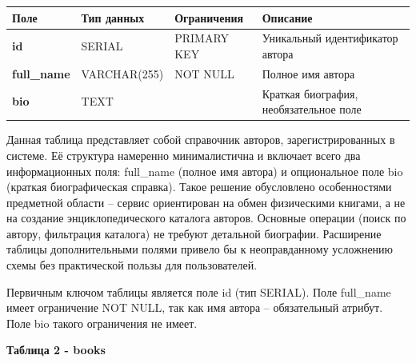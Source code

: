 \documentclass[14pt,a4paper]{extarticle}
\begin{document}
\begin{longtable}[]{@{}
  >{\centering\arraybackslash}p{}
  >{\centering\arraybackslash}p{}
  >{\centering\arraybackslash}p{}
  >{\centering\arraybackslash}p{}@{}}
\toprule\noalign{}
\begin{minipage}[b]{\linewidth}\centering
\textbf{Поле}
\end{minipage} & \begin{minipage}[b]{\linewidth}\centering
\textbf{Тип данных}
\end{minipage} & \begin{minipage}[b]{\linewidth}\centering
\textbf{Ограничения}
\end{minipage} & \begin{minipage}[b]{\linewidth}\centering
\textbf{Описание}
\end{minipage} \\
\midrule\noalign{}
\endhead
\bottomrule\noalign{}
\endlastfoot
\textbf{id} & SERIAL & PRIMARY KEY & Уникальный идентификатор автора \\
\textbf{full\_name} & VARCHAR(255) & NOT NULL & Полное имя автора \\
\textbf{bio} & TEXT & & Краткая биография, необязательное поле \\
\end{longtable}

Данная таблица представляет собой справочник авторов, зарегистрированных
в системе. Её структура намеренно минималистична и включает всего два
информационных поля: full\_name (полное имя автора) и опциональное поле
bio (краткая биографическая справка). Такое решение обусловлено
особенностями предметной области -- сервис ориентирован на обмен
физическими книгами, а не на создание энциклопедического каталога
авторов. Основные операции (поиск по автору, фильтрация каталога) не
требуют детальной биографии. Расширение таблицы дополнительными полями
привело бы к неоправданному усложнению схемы без практической пользы для
пользователей.

Первичным ключом таблицы является поле id (тип SERIAL). Поле full\_name
имеет ограничение NOT NULL, так как имя автора -- обязательный атрибут.
Поле bio такого ограничения не имеет.

\newpage
\textbf{Таблица 2 - books}
\end{document}
